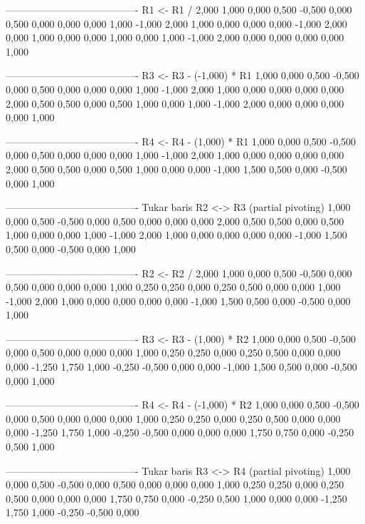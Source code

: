 \documentclass[12pt]{article}
\begin{document}
\begin{enumerate}
\begin{keluaran}
----------------------------------------
R1 <- R1 / 2,000
1,000   0,000   0,500   -0,500  0,000   0,500   0,000   0,000
0,000   1,000   -1,000  2,000   1,000   0,000   0,000   0,000
-1,000  2,000   0,000   1,000   0,000   0,000   1,000   0,000
1,000   -1,000  2,000   0,000   0,000   0,000   0,000   1,000

----------------------------------------
R3 <- R3 - (-1,000) * R1
1,000   0,000   0,500   -0,500  0,000   0,500   0,000   0,000
0,000   1,000   -1,000  2,000   1,000   0,000   0,000   0,000
0,000   2,000   0,500   0,500   0,000   0,500   1,000   0,000
1,000   -1,000  2,000   0,000   0,000   0,000   0,000   1,000

----------------------------------------
R4 <- R4 - (1,000) * R1
1,000   0,000   0,500   -0,500  0,000   0,500   0,000   0,000
0,000   1,000   -1,000  2,000   1,000   0,000   0,000   0,000
0,000   2,000   0,500   0,500   0,000   0,500   1,000   0,000
0,000   -1,000  1,500   0,500   0,000   -0,500  0,000   1,000

----------------------------------------
Tukar baris R2 <-> R3 (partial pivoting)
1,000   0,000   0,500   -0,500  0,000   0,500   0,000   0,000
0,000   2,000   0,500   0,500   0,000   0,500   1,000   0,000
0,000   1,000   -1,000  2,000   1,000   0,000   0,000   0,000
0,000   -1,000  1,500   0,500   0,000   -0,500  0,000   1,000

----------------------------------------
R2 <- R2 / 2,000
1,000   0,000   0,500   -0,500  0,000   0,500   0,000   0,000
0,000   1,000   0,250   0,250   0,000   0,250   0,500   0,000
0,000   1,000   -1,000  2,000   1,000   0,000   0,000   0,000
0,000   -1,000  1,500   0,500   0,000   -0,500  0,000   1,000

----------------------------------------
R3 <- R3 - (1,000) * R2
1,000   0,000   0,500   -0,500  0,000   0,500   0,000   0,000
0,000   1,000   0,250   0,250   0,000   0,250   0,500   0,000
0,000   0,000   -1,250  1,750   1,000   -0,250  -0,500  0,000
0,000   -1,000  1,500   0,500   0,000   -0,500  0,000   1,000

----------------------------------------
R4 <- R4 - (-1,000) * R2
1,000   0,000   0,500   -0,500  0,000   0,500   0,000   0,000
0,000   1,000   0,250   0,250   0,000   0,250   0,500   0,000
0,000   0,000   -1,250  1,750   1,000   -0,250  -0,500  0,000
0,000   0,000   1,750   0,750   0,000   -0,250  0,500   1,000

----------------------------------------
Tukar baris R3 <-> R4 (partial pivoting)
1,000   0,000   0,500   -0,500  0,000   0,500   0,000   0,000
0,000   1,000   0,250   0,250   0,000   0,250   0,500   0,000
0,000   0,000   1,750   0,750   0,000   -0,250  0,500   1,000
0,000   0,000   -1,250  1,750   1,000   -0,250  -0,500  0,000


\end{keluaran}
\end{enumerate}
\end{document}
